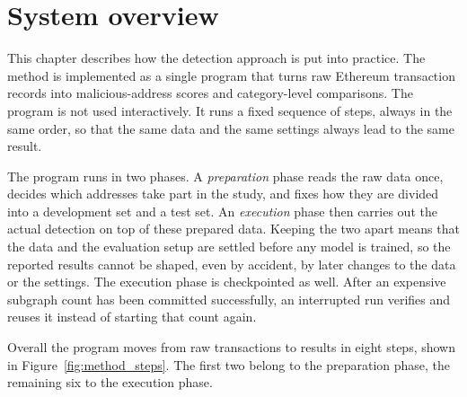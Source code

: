 \section{System overview}
\label{sec:system_overview}

This chapter describes how the detection approach is put into practice. The
method is implemented as a single program that turns raw Ethereum transaction
records into malicious-address scores and category-level comparisons. The
program is not used interactively. It runs a fixed sequence of steps, always in
the same order, so that the same data and the same settings always lead to the
same result.

The program runs in two phases. A \emph{preparation} phase reads the raw data
once, decides which addresses take part in the study, and fixes how they are
divided into a development set and a test set. An \emph{execution} phase then carries
out the actual detection on top of these prepared data. Keeping the two apart
means that the data and the evaluation setup are settled before any model is
trained, so the reported results cannot be shaped, even by accident, by later
changes to the data or the settings. The execution phase is checkpointed as
well. After an expensive subgraph count has been committed successfully, an
interrupted run verifies and reuses it instead of starting that count again.

Overall the program moves from raw transactions to results in eight steps, shown
in Figure~\ref{fig:method_steps}. The first two belong to the preparation phase,
the remaining six to the execution phase.

